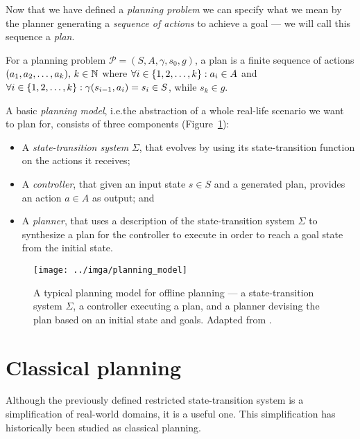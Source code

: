 Now that we have defined a \textit{planning problem} we can specify what we mean
by the planner generating a \textit{sequence of actions} to achieve a goal --- we will
call this sequence a \textit{plan}.

\begin{defn}[Plan]\label{defn:plan}\citep[Section~1.5]{Ghallab2004}
For a planning problem $\mathcal{P} = (S, A, \gamma, s_0, g)$,
a plan is a finite sequence of actions $(a_1, a_2, \ldots, a_k),\, k \in \mathbb{N}$ where
$\forall i \in \{1, 2, \ldots, k\} : a_i \in A$ and
$\forall i \in \{1, 2, \ldots, k\} : \gamma(s_{i-1}, a_i) = s_i \in S$, while $s_k \in g$.
\end{defn}

A basic \textit{planning model}, i.e.\;the abstraction of a whole real-life scenario
we want to plan for, consists of three components (Figure~\ref{fig:planning-model}):
\begin{itemize}
\item A \textit{state-transition system} $\Sigma$, that evolves by using its state-transition function on the actions
it receives;
\item A \textit{controller}, that given an input state $s \in S$ and a generated plan, provides an action $a \in A$ as output; and
\item A \textit{planner}, that uses a description of the state-transition system $\Sigma$ to synthesize a plan for the controller
to execute in order to reach a goal state from the initial state.
\end{itemize}

\begin{figure}[tb]
\begin{center}
\texttt{[image: ../imga/planning\_model]}
\end{center}
\caption[A typical planning model for offline planning.]{A typical planning model for offline planning --- a state-transition system $\Sigma$, a controller executing a plan, and a planner devising the plan based on an initial state and goals. Adapted from \citep[Figure~1.3]{Ghallab2004}.}
\label{fig:planning-model}
\end{figure}

\section{Classical planning}\label{classical-planning}

Although the previously defined restricted state-transition system is a simplification of real-world
domains, it is a useful one. 
This simplification has historically been studied as classical planning.

